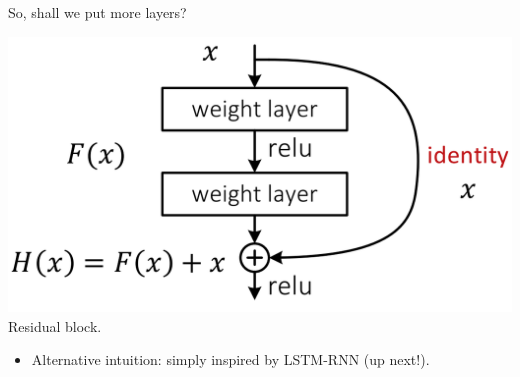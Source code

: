 \begin{frame}{So, shall we put more layers?}
\begin{minipage}{0.45\textwidth}
\end{minipage}
\begin{minipage}{0.45\textwidth}
\begin{center}
    \includegraphics[height=0.3\textheight]{figures/resnet.png}\\
Residual block.
\end{center}
\end{minipage}
\vsp
\begin{itemize}
\item Alternative intuition: simply inspired by LSTM-RNN (up next!).
\end{itemize}
\end{frame}


